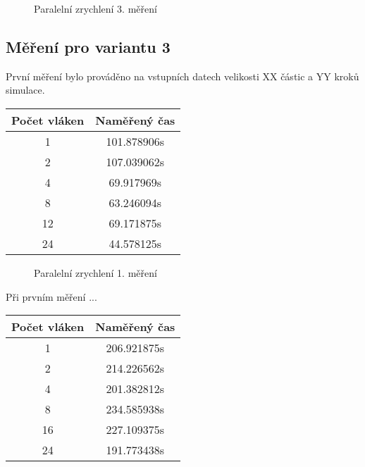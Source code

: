 \documentclass[12pt]{article}
\begin{document}
\begin{figure}[h]
  \begin{center}
    \caption{Paralelní zrychlení 3. měření} 
  \end{center}
\end{figure}



\subsection{Měření pro variantu 3}
První měření bylo prováděno na vstupních datech velikosti XX částic a YY kroků simulace.

\begin{center}
\begin{tabular}{ c | c }
\textbf{Počet vláken} & \textbf{Naměřený čas} \\ \hline \hline 
1 & 101.878906s \\ \hline
2 & 107.039062s \\ \hline
4 & 69.917969s \\ \hline
8 & 63.246094s \\ \hline
12 & 69.171875s \\ \hline
24 & 44.578125s \\ \hline
\end{tabular}
\end{center}

\begin{figure}[h]
  \begin{center}
    \caption{Paralelní zrychlení 1. měření} 
  \end{center}
\end{figure}

Při prvním měření ...



\begin{center}
\begin{tabular}{ c | c }
\textbf{Počet vláken} & \textbf{Naměřený čas} \\ \hline \hline 
1 & 206.921875s \\ \hline
2 & 214.226562s \\ \hline
4 & 201.382812s \\ \hline
8 & 234.585938s \\ \hline
16 & 227.109375s \\ \hline
24 & 191.773438s \\ \hline
\end{tabular}
\end{center}
\end{document}
